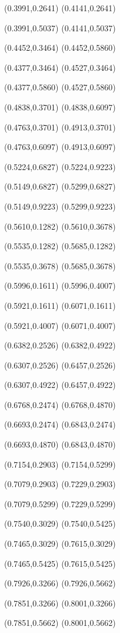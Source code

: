 \PST@Solid(0.3991,0.2641)
(0.4141,0.2641)

\PST@Solid(0.3991,0.5037)
(0.4141,0.5037)

\PST@Solid(0.4452,0.3464)
(0.4452,0.5860)

\PST@Solid(0.4377,0.3464)
(0.4527,0.3464)

\PST@Solid(0.4377,0.5860)
(0.4527,0.5860)

\PST@Solid(0.4838,0.3701)
(0.4838,0.6097)

\PST@Solid(0.4763,0.3701)
(0.4913,0.3701)

\PST@Solid(0.4763,0.6097)
(0.4913,0.6097)

\PST@Solid(0.5224,0.6827)
(0.5224,0.9223)

\PST@Solid(0.5149,0.6827)
(0.5299,0.6827)

\PST@Solid(0.5149,0.9223)
(0.5299,0.9223)

\PST@Solid(0.5610,0.1282)
(0.5610,0.3678)

\PST@Solid(0.5535,0.1282)
(0.5685,0.1282)

\PST@Solid(0.5535,0.3678)
(0.5685,0.3678)

\PST@Solid(0.5996,0.1611)
(0.5996,0.4007)

\PST@Solid(0.5921,0.1611)
(0.6071,0.1611)

\PST@Solid(0.5921,0.4007)
(0.6071,0.4007)

\PST@Solid(0.6382,0.2526)
(0.6382,0.4922)

\PST@Solid(0.6307,0.2526)
(0.6457,0.2526)

\PST@Solid(0.6307,0.4922)
(0.6457,0.4922)

\PST@Solid(0.6768,0.2474)
(0.6768,0.4870)

\PST@Solid(0.6693,0.2474)
(0.6843,0.2474)

\PST@Solid(0.6693,0.4870)
(0.6843,0.4870)

\PST@Solid(0.7154,0.2903)
(0.7154,0.5299)

\PST@Solid(0.7079,0.2903)
(0.7229,0.2903)

\PST@Solid(0.7079,0.5299)
(0.7229,0.5299)

\PST@Solid(0.7540,0.3029)
(0.7540,0.5425)

\PST@Solid(0.7465,0.3029)
(0.7615,0.3029)

\PST@Solid(0.7465,0.5425)
(0.7615,0.5425)

\PST@Solid(0.7926,0.3266)
(0.7926,0.5662)

\PST@Solid(0.7851,0.3266)
(0.8001,0.3266)

\PST@Solid(0.7851,0.5662)
(0.8001,0.5662)

